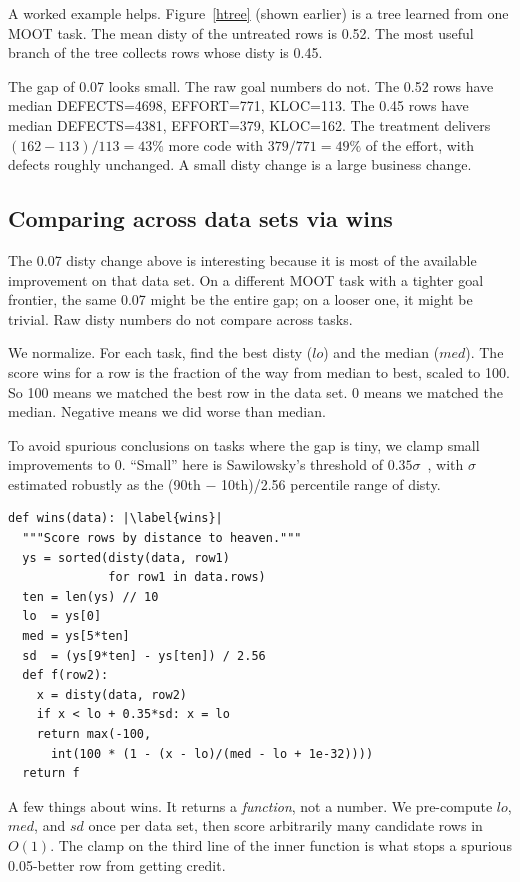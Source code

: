 \documentclass[AMA,STIX2COL]{WileyNJDv5}
\begin{document}
A worked example helps. Figure~\ref{htree} (shown earlier) is a
tree learned from one MOOT task. The mean \textsf{disty} of the
untreated rows is 0.52. The most useful branch of the tree
collects rows whose \textsf{disty} is 0.45.

The gap of 0.07 looks small. The raw goal numbers do not. The
0.52 rows have median DEFECTS=4698, EFFORT=771, KLOC=113. The
0.45 rows have median DEFECTS=4381, EFFORT=379, KLOC=162. The
treatment delivers $(162-113)/113 = 43\%$ more code with
$379/771 = 49\%$ of the effort, with defects roughly unchanged.
A small \textsf{disty} change is a large business change.

\subsection{Comparing across data sets via \textsf{wins}}

The 0.07 \textsf{disty} change above is interesting because it
is most of the available improvement on that data set. On a
different MOOT task with a tighter goal frontier, the same 0.07
might be the entire gap; on a looser one, it might be trivial.
Raw \textsf{disty} numbers do not compare across tasks.

We normalize. For each task, find the best \textsf{disty} ($lo$)
and the median ($med$). The score \textsf{wins} for a row is the
fraction of the way from median to best, scaled to 100. So 100
means we matched the best row in the data set. 0 means we
matched the median. Negative means we did worse than median.

To avoid spurious conclusions on tasks where the gap is tiny, we
clamp small improvements to 0. ``Small'' here is Sawilowsky's
threshold of $0.35\sigma$~\cite{sawilowsky2009new}, with $\sigma$
estimated robustly as the (90th $-$ 10th)/2.56 percentile range
of \textsf{disty}.

\begin{verbatim}
def wins(data): |\label{wins}|
  """Score rows by distance to heaven."""
  ys = sorted(disty(data, row1)
              for row1 in data.rows)
  ten = len(ys) // 10
  lo  = ys[0]
  med = ys[5*ten]
  sd  = (ys[9*ten] - ys[ten]) / 2.56
  def f(row2):
    x = disty(data, row2)
    if x < lo + 0.35*sd: x = lo
    return max(-100,
      int(100 * (1 - (x - lo)/(med - lo + 1e-32))))
  return f
\end{verbatim}

A few things about \textsf{wins}. It returns a {\em function},
not a number. We pre-compute $lo$, $med$, and $sd$ once per data
set, then score arbitrarily many candidate rows in $O(1)$. The
clamp on the third line of the inner function is what stops a
spurious 0.05-better row from getting credit.
\end{document}
